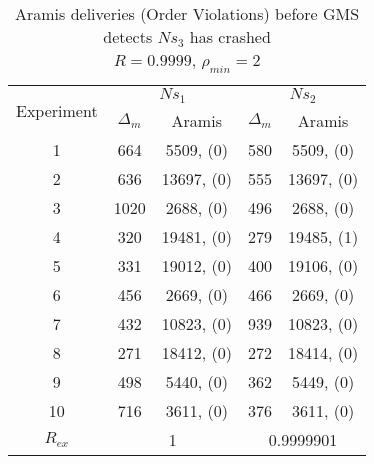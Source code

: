 \begin{table}[p]
    \begin{center}
        \renewcommand{\arraystretch}{1.25}
        \begin{tabular}{|c|c|c|c|c|}
            \hline
            \multirow{2}{*}{Experiment} & \multicolumn{2}{|c|}{$Ns_1$} & \multicolumn{2}{|c|}{$Ns_2$} \\ \cline{2-5}
                                                       & $\Delta_m$&\textsf{Aramis} & $\Delta_m$&\textsf{Aramis} \\ \hline \hline
            1 & 664 & 5509, (0) & 580 & 5509, (0) \\ \hline
            2 & 636 & 13697, (0) & 555 & 13697, (0) \\ \hline
            3 & 1020 & 2688, (0) & 496 & 2688, (0) \\ \hline
            4 & 320 & 19481, (0) & 279 & 19485, (1) \\ \hline
            5 & 331 & 19012, (0) & 400 & 19106, (0) \\ \hline
            6 & 456 & 2669, (0) & 466 & 2669, (0) \\ \hline
            7 & 432 & 10823, (0) & 939 & 10823, (0) \\ \hline
            8 & 271 & 18412, (0) & 272 & 18414, (0) \\ \hline
            9 & 498 & 5440, (0) & 362 & 5449, (0) \\ \hline
            10 & 716 & 3611, (0) & 376 & 3611, (0) \\ \hline \hline
            $R_{ex}$ & \multicolumn{2}{|c|}{1} & \multicolumn{2}{|c|}{0.9999901} \\ \hline
        \end{tabular}
        \caption[\textsf{Aramis} deliveries before GMS detects node crash ($R=0.9999$, $\rho_{min}=2$)]{\textsf{Aramis} deliveries (Order Violations) before GMS detects $Ns_3$ has crashed \\ $R=0.9999$, $\rho_{min}=2$}
        \label{table:crashed_node_rho2}
    \end{center}
\end{table}

